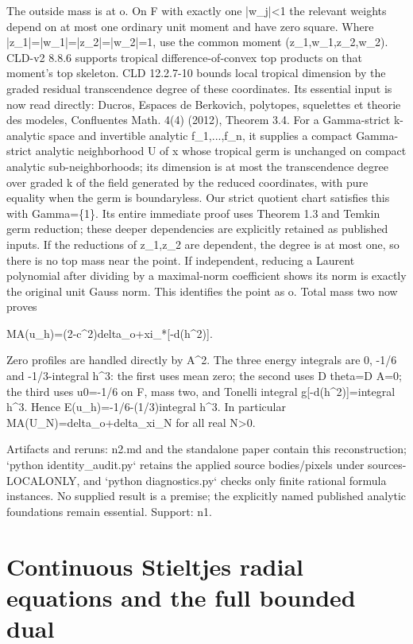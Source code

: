 \documentclass[11pt]{article}
\begin{document}
The outside mass is at o. On F with exactly one |w\_j|<1 the relevant weights depend on at most one ordinary unit moment and have zero square. Where |z\_1|=|w\_1|=|z\_2|=|w\_2|=1, use the common moment (z\_1,w\_1,z\_2,w\_2). CLD-v2 8.8.6 supports tropical difference-of-convex top products on that moment's top skeleton. CLD 12.2.7-10 bounds local tropical dimension by the graded residual transcendence degree of these coordinates. Its essential input is now read directly: Ducros, Espaces de Berkovich, polytopes, squelettes et theorie des modeles, Confluentes Math. 4(4) (2012), Theorem 3.4. For a Gamma-strict k-analytic space and invertible analytic f\_1,...,f\_n, it supplies a compact Gamma-strict analytic neighborhood U of x whose tropical germ is unchanged on compact analytic sub-neighborhoods; its dimension is at most the transcendence degree over graded k of the field generated by the reduced coordinates, with pure equality when the germ is boundaryless. Our strict quotient chart satisfies this with Gamma=\{1\}. Its entire immediate proof uses Theorem 1.3 and Temkin germ reduction; these deeper dependencies are explicitly retained as published inputs. If the reductions of z\_1,z\_2 are dependent, the degree is at most one, so there is no top mass near the point. If independent, reducing a Laurent polynomial after dividing by a maximal-norm coefficient shows its norm is exactly the original unit Gauss norm. This identifies the point as o. Total mass two now proves

MA(u\_h)=(2-c\textasciicircum{}2)delta\_o+xi\_*[-d(h\textasciicircum{}2)].

Zero profiles are handled directly by A\textasciicircum{}2. The three energy integrals are 0, -1/6 and -1/3-integral h\textasciicircum{}3: the first uses mean zero; the second uses D theta=D A=0; the third uses u0=-1/6 on F, mass two, and Tonelli integral g[-d(h\textasciicircum{}2)]=integral h\textasciicircum{}3. Hence E(u\_h)=-1/6-(1/3)integral h\textasciicircum{}3. In particular MA(U\_N)=delta\_o+delta\_xi\_N for all real N>0.

Artifacts and reruns: n2.md and the standalone paper contain this reconstruction; `python identity\_audit.py` retains the applied source bodies/pixels under sources-LOCALONLY, and `python diagnostics.py` checks only finite rational formula instances. No supplied result is a premise; the explicitly named published analytic foundations remain essential. Support: n1.

\section*{Continuous Stieltjes radial equations and the full bounded dual}
\end{document}
